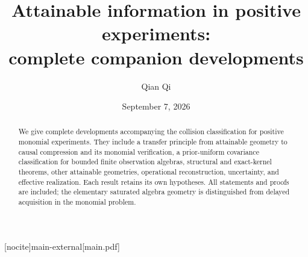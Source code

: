 
[nocite]{main-external}[main.pdf]
\renewcommand{\thesection}{C.\arabic{section}}
\renewcommand{\theHsection}{companion.\arabic{section}}
\renewcommand{\theequation}{C.\arabic{equation}}
\renewcommand{\theHequation}{companion.\arabic{equation}}
\title[Attainable information: complete companion developments]{Attainable information in positive experiments:\\complete companion developments}
\author{Qian Qi}
\date{September 7, 2026}

\begin{abstract}
We give complete developments accompanying the collision classification
for positive monomial experiments. They include a transfer principle
from attainable geometry to causal compression and its monomial
verification, a prior-uniform covariance classification for bounded
finite observation algebras, structural and exact-kernel theorems,
other attainable geometries, operational reconstruction, uncertainty,
and effective realization. Each result retains its own hypotheses.
All statements and proofs are included; the elementary saturated
algebra geometry is distinguished from delayed acquisition in the
monomial problem.
\end{abstract}
\maketitle





